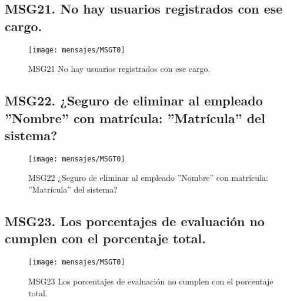 \subsection{MSG21. No hay usuarios registrados con ese cargo.}
    \begin{figure}[htbp]
        \begin{center}
            \texttt{[image: mensajes/MSGT0]}
            \caption{MSG21 No hay usuarios registrados con ese cargo.}
            \label{fig:MSG21}
        \end{center}
    \end{figure}


\subsection{MSG22. ¿Seguro de eliminar al empleado ''Nombre'' con matrícula: ''Matrícula'' del sistema?}
    \begin{figure}[htbp]
        \begin{center}
            \texttt{[image: mensajes/MSGT0]}
            \caption{MSG22 ¿Seguro de eliminar al empleado ''Nombre'' con matrícula: ''Matrícula'' del sistema?}
            \label{fig:MSG22}
        \end{center}
    \end{figure}
    
\subsection{MSG23. Los porcentajes de evaluación no cumplen con el porcentaje total.}
    \begin{figure}[htbp]
        \begin{center}
            \texttt{[image: mensajes/MSGT0]}
            \caption{ MSG23 Los porcentajes de evaluación no cumplen con el porcentaje total.}
            \label{fig:MSG21}
        \end{center}
    \end{figure}

